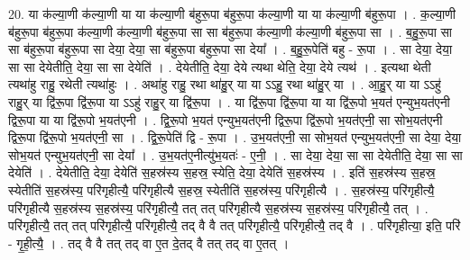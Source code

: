 \documentclass[17pt]{extarticle}
\begin{document}
20. या क॑ल्या॒णी क॑ल्या॒णी या या क॑ल्या॒णी ब॑हुरू॒पा ब॑हुरू॒पा क॑ल्या॒णी या या क॑ल्या॒णी ब॑हुरू॒पा । . क॒ल्या॒णी ब॑हुरू॒पा ब॑हुरू॒पा क॑ल्या॒णी क॑ल्या॒णी ब॑हुरू॒पा सा सा ब॑हुरू॒पा क॑ल्या॒णी क॑ल्या॒णी ब॑हुरू॒पा सा । . ब॒हु॒रू॒पा सा सा ब॑हुरू॒पा ब॑हुरू॒पा सा देया॒ देया॒ सा ब॑हुरू॒पा ब॑हुरू॒पा सा देया᳚ । . ब॒हु॒रू॒पेति॑ बहु - रू॒पा । . सा देया॒ देया॒ सा सा देयेतीति॒ देया॒ सा सा देयेति॑ । . देयेतीति॒ देया॒ देये त्यथा थेति॒ देया॒ देये त्यथ॑ । . इत्यथा थेती त्यथा॑हु राहु॒ रथेती त्यथा॑हुः । . अथा॑हु राहु॒ रथा था॑हु॒र् या या ऽऽहु॒ रथा था॑हु॒र् या । . आ॒हु॒र् या या ऽऽहु॑ राहु॒र् या द्वि॑रू॒पा द्वि॑रू॒पा या ऽऽहु॑ राहु॒र् या द्वि॑रू॒पा । . या द्वि॑रू॒पा द्वि॑रू॒पा या या द्वि॑रू॒पो भ॒यत॑ एन्युभ॒यत॑एनी द्विरू॒पा या या द्वि॑रू॒पो भ॒यत॑एनी । . द्वि॒रू॒पो भ॒यत॑ एन्युभ॒यत॑एनी द्विरू॒पा द्वि॑रू॒पो भ॒यत॑एनी॒ सा सोभ॒यत॑एनी द्विरू॒पा द्वि॑रू॒पो भ॒यत॑एनी॒ सा । . द्वि॒रू॒पेति॑ द्वि - रू॒पा । . उ॒भ॒यत॑एनी॒ सा सोभ॒यत॑ एन्युभ॒यत॑एनी॒ सा देया॒ देया॒ सोभ॒यत॑ एन्युभ॒यत॑एनी॒ सा देया᳚ । . उ॒भ॒यत॑ए॒नीत्यु॑भ॒यतः॑ - ए॒नी॒ । . सा देया॒ देया॒ सा सा देयेतीति॒ देया॒ सा सा देयेति॑ । . देयेतीति॒ देया॒ देयेति॑ स॒हस्र॑स्य स॒हस्र॒ स्येति॒ देया॒ देयेति॑ स॒हस्र॑स्य । . इति॑ स॒हस्र॑स्य स॒हस्र॒ स्येतीति॑ स॒हस्र॑स्य॒ परि॑गृहीत्यै॒ परि॑गृहीत्यै स॒हस्र॒ स्येतीति॑ स॒हस्र॑स्य॒ परि॑गृहीत्यै । . स॒हस्र॑स्य॒ परि॑गृहीत्यै॒ परि॑गृहीत्यै स॒हस्र॑स्य स॒हस्र॑स्य॒ परि॑गृहीत्यै॒ तत् तत् परि॑गृहीत्यै स॒हस्र॑स्य स॒हस्र॑स्य॒ परि॑गृहीत्यै॒ तत् । . परि॑गृहीत्यै॒ तत् तत् परि॑गृहीत्यै॒ परि॑गृहीत्यै॒ तद् वै वै तत् परि॑गृहीत्यै॒ परि॑गृहीत्यै॒ तद् वै । . परि॑गृहीत्या॒ इति॒ परि॑ - गृ॒ही॒त्यै॒ । . तद् वै वै तत् तद् वा ए॒त दे॒तद् वै तत् तद् वा ए॒तत् । \newline
\end{document}
